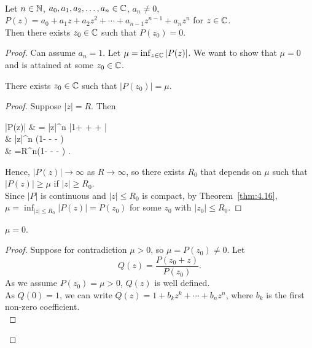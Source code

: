 \begin{thm}\\
	Let $n \in \mathbb{N}$, $a_{0},a_{1},a_{2},\ldots ,a_n \in \mathbb{C}$, $a_n\neq 0$,\\
	$P(z)=a_{0}+a_{1}z+a_{2}z^2+\cdots + a_{n-1}z^{n-1}+a_n z^{n}$ for $z \in \mathbb{C}$.\\
	Then there exists $z_{0} \in \mathbb{C}$ such that $P(z_{0})=0$.
\end{thm}
\begin{proof}
	Can assume $a_n=1$. Let $\mu=\inf_{z \in \mathbb{C}}\left|P(z)\right|$.
	We want to show that $\mu=0$ and is attained at some $z_{0} \in \mathbb{C}$.
	\begin{claim}[1]
		There exists $z_{0} \in \mathbb{C}$ such that $\left|P(z_{0})\right|=\mu$.
	\end{claim}
	\begin{proof}
		Suppose $\left|z\right|=R$. Then
		\begin{flalign*}
			\left|P(z)\right| & = \left|z\right|^{n} \cdot \left|1+ + \cdots + \right|                                               \\
			                  & \ge \left|z\right|^{n} \left(1- - \cdots - \right) \\
			                  & =R^{n}\left(1- - \cdots - \right)
			.\end{flalign*}
		Hence, $\left|P(z)\right|\to \infty$ as $R\to \infty$, so there exists $R_{0}$ that depends on $\mu$ such that $\left|P(z)\right|\ge \mu$ if $\left|z\right|\ge R_{0}$.\\
		Since $\left|P\right|$ is continuous and $\left|z\right|\le R_{0}$ is compact, by Theorem~\ref{thm:4.16}, $\mu=\inf_{\left|z\right|\le R_{0}}\left|P(z)\right|=P(z_{0})$ for some $z_{0}$ with $\left|z_{0}\right|\le R_{0}$.
	\end{proof}
	\begin{claim}[2]
		$\mu=0$.
	\end{claim}
	\begin{proof}
		Suppose for contradiction $\mu>0$, so $\mu=P(z_{0})\neq 0$.
		Let
		\[
			Q(z)= \frac{P(z_{0}+z)}{P(z_{0})}
			.\]
		As we assume $P(z_{0})=\mu > 0$, $Q(z)$ is well defined.\\
		As $Q(0)=1$, we can write $Q(z)=1+b_{k}z^{k}+ \cdots + b_n z^{n}$, where $b_k$ is the first non-zero coefficient.\\

\end{proof}
\end{proof}
